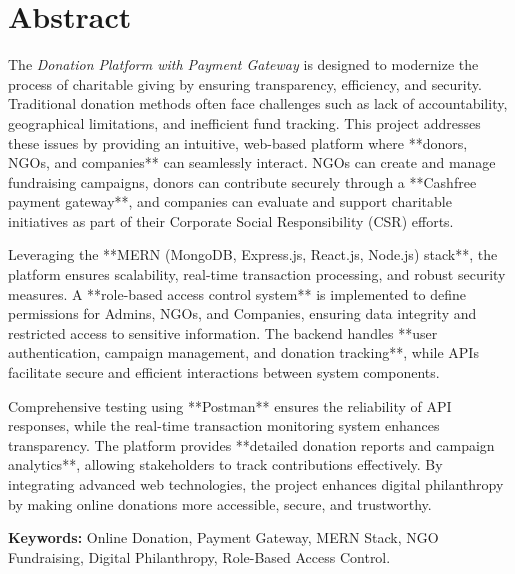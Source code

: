 \chapter*{Abstract}

\noindent The \textit{Donation Platform with Payment Gateway} is designed to modernize the process of charitable giving by ensuring transparency, efficiency, and security. Traditional donation methods often face challenges such as lack of accountability, geographical limitations, and inefficient fund tracking. This project addresses these issues by providing an intuitive, web-based platform where **donors, NGOs, and companies** can seamlessly interact. NGOs can create and manage fundraising campaigns, donors can contribute securely through a **Cashfree payment gateway**, and companies can evaluate and support charitable initiatives as part of their Corporate Social Responsibility (CSR) efforts.  

Leveraging the **MERN (MongoDB, Express.js, React.js, Node.js) stack**, the platform ensures scalability, real-time transaction processing, and robust security measures. A **role-based access control system** is implemented to define permissions for Admins, NGOs, and Companies, ensuring data integrity and restricted access to sensitive information. The backend handles **user authentication, campaign management, and donation tracking**, while APIs facilitate secure and efficient interactions between system components.  

Comprehensive testing using **Postman** ensures the reliability of API responses, while the real-time transaction monitoring system enhances transparency. The platform provides **detailed donation reports and campaign analytics**, allowing stakeholders to track contributions effectively. By integrating advanced web technologies, the project enhances digital philanthropy by making online donations more accessible, secure, and trustworthy.  

\noindent\textbf{Keywords:} Online Donation, Payment Gateway, MERN Stack, NGO Fundraising, Digital Philanthropy, Role-Based Access Control.
